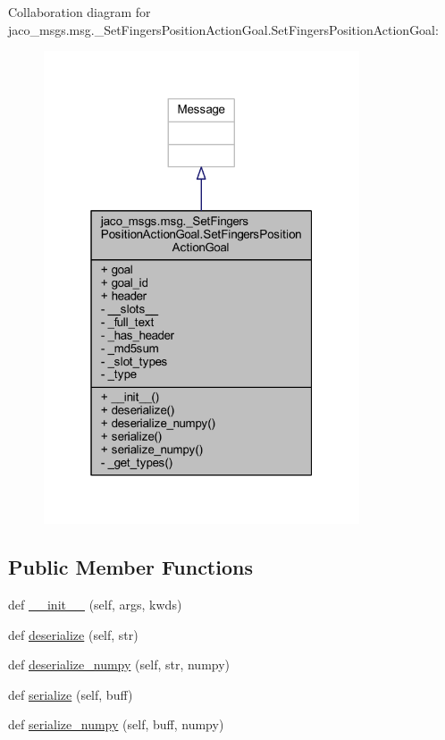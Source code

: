 Collaboration diagram for jaco\+\_\+msgs.\+msg.\+\_\+\+Set\+Fingers\+Position\+Action\+Goal.\+Set\+Fingers\+Position\+Action\+Goal\+:
\nopagebreak
\begin{figure}[H]
\begin{center}
\leavevmode
\includegraphics[width=265pt]{d4/d23/classjaco__msgs_1_1msg_1_1__SetFingersPositionActionGoal_1_1SetFingersPositionActionGoal__coll__graph}
\end{center}
\end{figure}
\subsection*{Public Member Functions}
\begin{DoxyCompactItemize}
\item 
def \hyperlink{classjaco__msgs_1_1msg_1_1__SetFingersPositionActionGoal_1_1SetFingersPositionActionGoal_a6dc1abbd155d714564086f270d8abb01}{\+\_\+\+\_\+init\+\_\+\+\_\+} (self, args, kwds)
\item 
def \hyperlink{classjaco__msgs_1_1msg_1_1__SetFingersPositionActionGoal_1_1SetFingersPositionActionGoal_a00ce8a4089881c2874855c061913c9b4}{deserialize} (self, str)
\item 
def \hyperlink{classjaco__msgs_1_1msg_1_1__SetFingersPositionActionGoal_1_1SetFingersPositionActionGoal_a2a8a0107fdcda71b66c61187de99612a}{deserialize\+\_\+numpy} (self, str, numpy)
\item 
def \hyperlink{classjaco__msgs_1_1msg_1_1__SetFingersPositionActionGoal_1_1SetFingersPositionActionGoal_a2fcf3ad33310011f88e6f076938498eb}{serialize} (self, buff)
\item 
def \hyperlink{classjaco__msgs_1_1msg_1_1__SetFingersPositionActionGoal_1_1SetFingersPositionActionGoal_ab64f98f291f53c3c9055bbc8a5f26153}{serialize\+\_\+numpy} (self, buff, numpy)
\end{DoxyCompactItemize}
